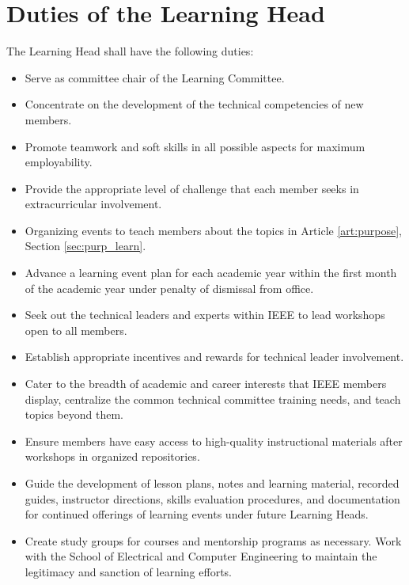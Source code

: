 \documentclass[12pt]{constitution}
\begin{document}
\section{Duties of the Learning Head}
\label{sec:officer_learn}
The Learning Head shall have the following duties:
\begin{itemize}
    \item Serve as committee chair of the Learning Committee.
    \item Concentrate on the development of the technical competencies of new members.
    \item Promote teamwork and soft skills in all possible aspects for maximum employability.
    \item Provide the appropriate level of challenge that each member seeks in extracurricular involvement.
    \item Organizing events to teach members about the topics in Article \ref{art:purpose}, Section \ref{sec:purp_learn}.
    \item Advance a learning event plan for each academic year within the first month of the academic year under penalty of dismissal from office.
    \item Seek out the technical leaders and experts within IEEE to lead workshops open to all members.
    \item Establish appropriate incentives and rewards for technical leader involvement.
    \item Cater to the breadth of academic and career interests that IEEE members display, centralize the common technical committee training needs, and teach topics beyond them.
    \item Ensure members have easy access to high-quality instructional materials after workshops in organized repositories.
    \item Guide the development of lesson plans, notes and learning material, recorded guides, instructor directions, skills evaluation procedures, and documentation for continued offerings of learning events under future Learning Heads.
    \item Create study groups for courses and mentorship programs as necessary.
    Work with the School of Electrical and Computer Engineering to maintain the legitimacy and sanction of learning efforts.
\end{itemize}
\end{document}
